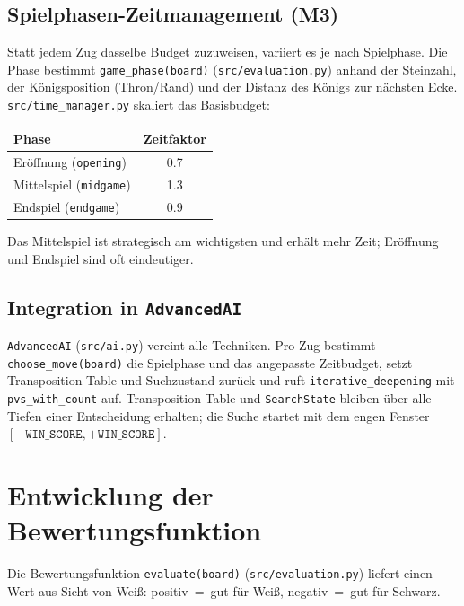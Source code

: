 \documentclass[11pt,a4paper]{article}
\newcommand{\code}[1]{\texttt{\small #1}}
\begin{document}
\subsection{Spielphasen-Zeitmanagement (M3)}
Statt jedem Zug dasselbe Budget zuzuweisen, variiert es je nach Spielphase.
Die Phase bestimmt \code{game\_phase(board)} (\code{src/evaluation.py}) anhand
der Steinzahl, der K\"onigsposition (Thron/Rand) und der Distanz des K\"onigs zur
n\"achsten Ecke.
\code{src/time\_manager.py} skaliert das Basisbudget:

\begin{center}
\begin{tabular}{lc}
\toprule
\textbf{Phase} & \textbf{Zeitfaktor} \\
\midrule
Er\"offnung (\code{opening}) & 0.7 \\
Mittelspiel (\code{midgame}) & 1.3 \\
Endspiel (\code{endgame})    & 0.9 \\
\bottomrule
\end{tabular}
\end{center}

Das Mittelspiel ist strategisch am wichtigsten und erh\"alt mehr Zeit;
Er\"offnung und Endspiel sind oft eindeutiger.

\subsection{Integration in \code{AdvancedAI}}
\code{AdvancedAI} (\code{src/ai.py}) vereint alle Techniken.
Pro Zug bestimmt \code{choose\_move(board)} die Spielphase und das angepasste
Zeitbudget, setzt Transposition Table und Suchzustand zur\"uck und ruft
\code{iterative\_deepening} mit \code{pvs\_with\_count} auf.
Transposition Table und \code{SearchState} bleiben \"uber alle Tiefen einer
Entscheidung erhalten; die Suche startet mit dem engen Fenster
$[-\texttt{WIN\_SCORE}, +\texttt{WIN\_SCORE}]$.

\section{Entwicklung der Bewertungsfunktion}\label{sec:eval}
Die Bewertungsfunktion \code{evaluate(board)} (\code{src/evaluation.py}) liefert
einen Wert aus Sicht von Wei\ss: positiv~=~gut f\"ur Wei\ss, negativ~=~gut f\"ur
Schwarz.
\end{document}
